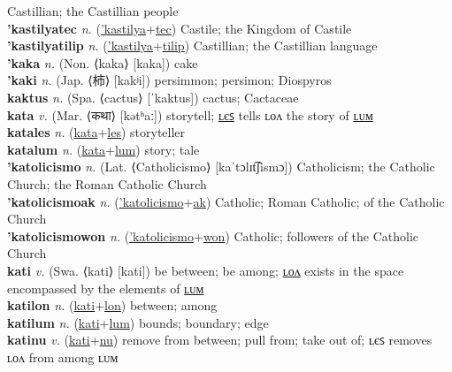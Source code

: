 Castillian; the Castillian people \label{'kastilyawon} \\
\textbf{'kastilyatec} \textit{n.} (\hyperref['kastilya]{'kastilya}+\hyperref[tec]{tec})
Castile; the Kingdom of Castile \label{'kastilyatec} \\
\textbf{'kastilyatilip} \textit{n.} (\hyperref['kastilya]{'kastilya}+\hyperref[tilip]{tilip})
Castillian; the Castillian language \label{'kastilyatilip} \\
\textbf{'kaka} \textit{n.} (Non. ⟨kaka⟩ [kaka])
cake \label{'kaka} \\
\textbf{'kaki} \textit{n.} (Jap. ⟨柿⟩ [kakʲi])
persimmon; persimon; Diospyros \label{'kaki} \\
\textbf{kaktus} \textit{n.} (Spa. ⟨cactus⟩ [ˈkaktus])
cactus; Cactaceae \label{kaktus} \\
\textbf{kata} \textit{v.} (Mar. ⟨कथा⟩ [kətʰaː])
storytell; \hyperref[katales]{ʟєꜱ} tells ʟᴏᴧ the story of \hyperref[katalum]{ʟᴜᴍ} \label{kata} \\
\textbf{katales} \textit{n.} (\hyperref[kata]{kata}+\hyperref[les]{les})
storyteller \label{katales} \\
\textbf{katalum} \textit{n.} (\hyperref[kata]{kata}+\hyperref[lum]{lum})
story; tale \label{katalum} \\
\textbf{'katolicismo} \textit{n.} (Lat. ⟨Catholicismo⟩ [kaˈtɔlɪt͡ʃismɔ])
Catholicism; the Catholic Church; the Roman Catholic Church \label{'katolicismo} \\
\textbf{'katolicismoak} \textit{n.} (\hyperref['katolicismo]{'katolicismo}+\hyperref[ak]{ak})
Catholic; Roman Catholic; of the Catholic Church \label{'katolicismoak} \\
\textbf{'katolicismowon} \textit{n.} (\hyperref['katolicismo]{'katolicismo}+\hyperref[won]{won})
Catholic; followers of the Catholic Church \label{'katolicismowon} \\
\textbf{kati} \textit{v.} (Swa. ⟨kati⟩ [kati])
be between; be among; \hyperref[katilon]{ʟᴏᴧ} exists in the space encompassed by the elements of \hyperref[katilum]{ʟᴜᴍ} \label{kati} \\
\textbf{katilon} \textit{n.} (\hyperref[kati]{kati}+\hyperref[lon]{lon})
between; among \label{katilon} \\
\textbf{katilum} \textit{n.} (\hyperref[kati]{kati}+\hyperref[lum]{lum})
bounds; boundary; edge \label{katilum} \\
\textbf{katinu} \textit{v.} (\hyperref[kati]{kati}+\hyperref[nu]{nu})
remove from between; pull from; take out of; ʟєꜱ removes ʟᴏᴧ from among ʟᴜᴍ \label{katinu} \\
